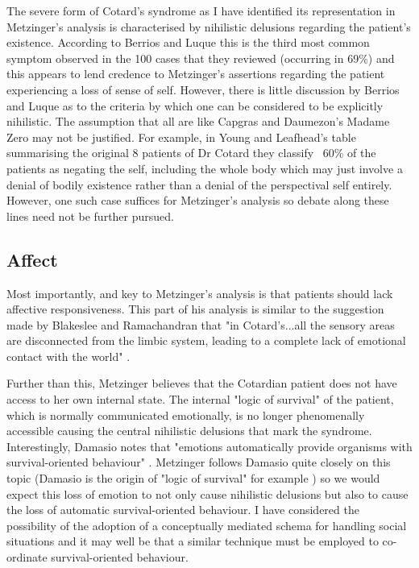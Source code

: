 The severe form of Cotard's syndrome as I have identified its representation in Metzinger's analysis is characterised by nihilistic delusions regarding the patient's existence. According to Berrios and Luque \cite{berrios1995b} this is the third most common symptom observed in the 100 cases that they reviewed (occurring in 69\%) and this appears to lend credence to Metzinger's assertions regarding the patient experiencing a loss of sense of self. However, there is little discussion by Berrios and Luque as to the criteria by which one can be considered to be explicitly nihilistic. The assumption that all are like Capgras and Daumezon's \cite{capras1936} Madame Zero may not be justified. For example, in Young and Leafhead's table summarising the original 8 patients of Dr Cotard they classify ~60\% of the patients as negating the self, including the whole body \cite[p. 152]{young1995} which may just involve a denial of bodily existence rather than a denial of the perspectival self entirely. However, one such case suffices for Metzinger's analysis so debate along these lines need not be further pursued.

\subsection{Affect}

Most importantly, and key to Metzinger's analysis is that patients should lack affective responsiveness. This part of his analysis is similar to the suggestion made by Blakeslee and Ramachandran that "in Cotard's...all the sensory areas are disconnected from the limbic system, leading to a complete lack of emotional contact with the world" \cite[p. 167]{blakeslee1998}.

Further than this, Metzinger believes that the Cotardian patient does not have access to her own internal state. The internal "logic of survival" of the patient, which is normally communicated emotionally, is no longer phenomenally accessible causing the central nihilistic delusions that mark the syndrome. Interestingly, Damasio notes that "emotions automatically provide organisms with survival-oriented behaviour" \cite[p. 56]{damasio2000}. Metzinger follows Damasio quite closely on this topic (Damasio is the origin of "logic of survival" for example \cite[p. 198]{metzinger2003}) so we would expect this loss of emotion to not only cause nihilistic delusions but also to cause the loss of automatic survival-oriented behaviour. I have considered the possibility of the adoption of a conceptually mediated schema for handling social situations and it may well be that a similar technique must be employed to co-ordinate survival-oriented behaviour.

